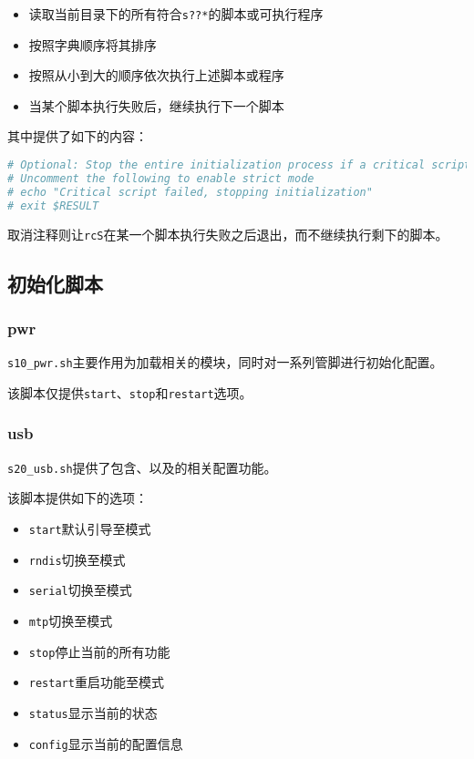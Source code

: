 \documentclass[UTF8]{ctexart}
\newcommand{\code}[1]{\colorbox{gray!10}{\lstinline[style=inlinecode]|#1|}}
\begin{document}
\begin{itemize}
    \item 读取当前目录下的所有符合\code{s??*}的脚本或可执行程序
    \item 按照字典顺序将其排序
    \item 按照从小到大的顺序依次执行上述脚本或程序
    \item 当某个脚本执行失败后，继续执行下一个脚本
\end{itemize}

\noindent 其中提供了如下的内容：

\begin{lstlisting}[language=sh]
# Optional: Stop the entire initialization process if a critical script fails
# Uncomment the following to enable strict mode
# echo "Critical script failed, stopping initialization"
# exit $RESULT
\end{lstlisting}

\noindent 取消注释则让\code{rcS}在某一个脚本执行失败之后退出，而不继续执行剩下的脚本。

\subsection{初始化脚本}

\subsubsection{pwr}

\code{s10_pwr.sh}主要作用为加载相关的模块，同时对一系列管脚进行初始化配置。

该脚本仅提供\code{start}、\code{stop}和\code{restart}选项。

\subsubsection{usb}

\code{s20_usb.sh}提供了包含、以及的相关配置功能。

该脚本提供如下的选项：

\begin{itemize}
    \item \code{start}默认引导至模式
    \item \code{rndis}切换至模式
    \item \code{serial}切换至模式
    \item \code{mtp}切换至模式
    \item \code{stop}停止当前的所有功能
    \item \code{restart}重启功能至模式
    \item \code{status}显示当前的状态
    \item \code{config}显示当前的配置信息
\end{itemize}
\end{document}
